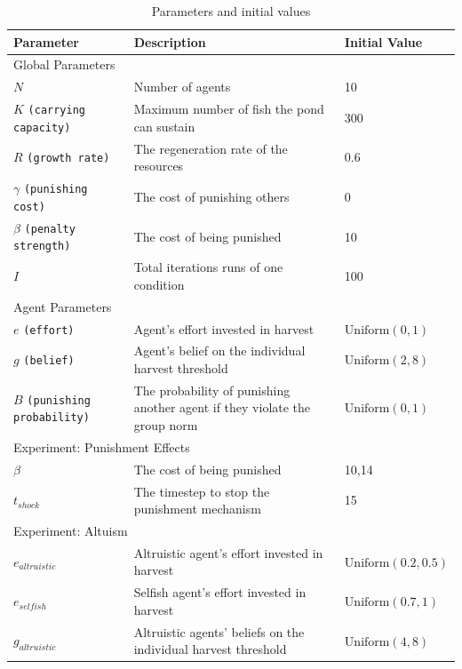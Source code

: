 \begin{table}[t]
    \centering
    \renewcommand{\arraystretch}{1.2}
    \caption{Parameters and initial values}
    \label{tab:parameters}
    \begin{tabularx}{\textwidth}{p{}Xp{}}
    \toprule
    \textbf{Parameter} & \textbf{Description} & \textbf{Initial Value} \\ \midrule
    \multicolumn{3}{l}{Global Parameters} \\ \midrule
    $N$ & Number of agents    &  10 \\
    $K$ \texttt{(carrying capacity)}  & Maximum number of fish the pond can sustain   &  300 \\ 
    $R$ \texttt{(growth rate)} & The regeneration rate of the resources & 0.6 \\
    $\gamma$ \texttt{(punishing cost)} & The cost of punishing others  & 0 \\
    $\beta$ \texttt{(penalty strength)} & The cost of being punished  & 10 \\
    $I$ & Total iterations runs of one condition  & 100 \\
    \midrule
    \multicolumn{3}{l}{Agent Parameters}  \\ \midrule
    $e$ \texttt{(effort)} & Agent's effort invested in harvest  &  $\textrm{Uniform}(0,1)$ \\
    $g$ \texttt{(belief)} & Agent's belief on the individual harvest threshold      & $\textrm{Uniform}(2,8)$ \\
    $B$ \texttt{(punishing probability)} & The probability of punishing another agent if they violate the group norm  & $\textrm{Uniform}(0,1)$ \\
    \midrule
    \multicolumn{3}{l}{Experiment: Punishment Effects} \\ \midrule 
    $\beta$ & The cost of being punished  & 10,14 \\
    $t_{shock}$ & The timestep to stop the punishment mechanism  & 15 \\ 
    \midrule
    \multicolumn{3}{l}{Experiment: Altuism} \\ \midrule 
    $e_{altruistic}$ & Altruistic agent's effort invested in harvest  &  $\textrm{Uniform}(0.2,0.5)$ \\
    $e_{selfish}$ & Selfish agent's effort invested in harvest  &  $\textrm{Uniform}(0.7,1)$ \\
    $g_{altruistic}$ & Altruistic agents' beliefs on the individual harvest threshold      & $\textrm{Uniform}(4,8)$ \\

\end{tabularx}
\end{table}
